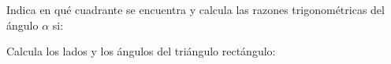 \documentclass[addpoints,spanish, 12pt,a4paper]{exam}
\begin{document}
\begin{questions}

\question Indica en qué cuadrante se encuentra y calcula las razones trigonométricas del ángulo $\alpha$ si: 



\question Calcula los lados y los ángulos del triángulo rectángulo:
\begin{parts} 

\end{parts}
\end{questions}
\end{document}
